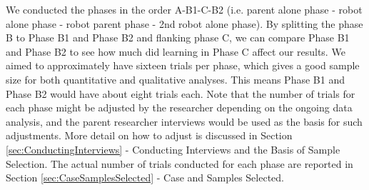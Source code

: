 \documentclass{ut-thesis}
\begin{document}
We conducted the phases in the order A-B1-C-B2 (i.e. parent alone phase - robot alone phase - robot parent phase - 2nd robot alone phase).  By splitting the phase B to Phase B1 and Phase B2 and flanking phase C, we can compare Phase B1 and Phase B2 to see how much did learning in Phase C affect our results.  We aimed to approximately have sixteen trials per phase, which gives a good sample size for both quantitative and qualitative analyses.  This means Phase B1 and Phase B2 would have about eight trials each.  Note that the number of trials for each phase might be adjusted by the researcher depending on the ongoing data analysis, and the parent researcher interviews would be used as the basis for such adjustments.  More detail on how to adjust is discussed in Section \ref{sec:ConductingInterviews} - Conducting Interviews and the Basis of Sample Selection.  The actual number of trials conducted for each phase are reported in Section \ref{sec:CaseSamplesSelected} - Case and Samples Selected.
\end{document}
